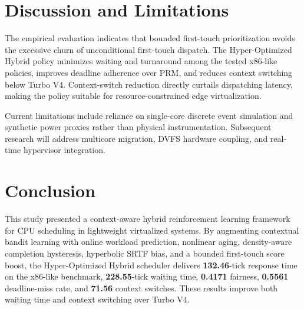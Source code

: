 \documentclass[conference]{IEEEtran}
\begin{document}
\section{Discussion and Limitations}
The empirical evaluation indicates that bounded first-touch prioritization avoids the excessive churn of unconditional first-touch dispatch. The Hyper-Optimized Hybrid policy minimizes waiting and turnaround among the tested x86-like policies, improves deadline adherence over PRM, and reduces context switching below Turbo V4. Context-switch reduction directly curtails dispatching latency, making the policy suitable for resource-constrained edge virtualization.

Current limitations include reliance on single-core discrete event simulation and synthetic power proxies rather than physical instrumentation. Subsequent research will address multicore migration, DVFS hardware coupling, and real-time hypervisor integration.

\section{Conclusion}
This study presented a context-aware hybrid reinforcement learning framework for CPU scheduling in lightweight virtualized systems. By augmenting contextual bandit learning with online workload prediction, nonlinear aging, density-aware completion hysteresis, hyperbolic SRTF bias, and a bounded first-touch score boost, the Hyper-Optimized Hybrid scheduler delivers \textbf{132.46}-tick response time on the x86-like benchmark, \textbf{228.55}-tick waiting time, \textbf{0.4171} fairness, \textbf{0.5561} deadline-miss rate, and \textbf{71.56} context switches. These results improve both waiting time and context switching over Turbo V4.
\end{document}
